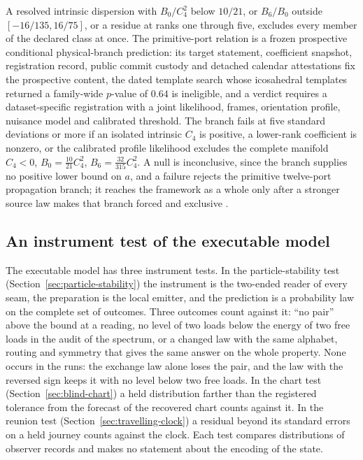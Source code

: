 \documentclass[11pt]{article}
\theoremstyle{definition}
\theoremstyle{remark}
\begin{document}
A resolved intrinsic dispersion with $B_0/C_4^2$ below $10/21$, or $B_6/B_0$
outside $[-16/135,16/75]$, or a residue at ranks one through five, excludes
every member of the declared class at once. The primitive-port relation is a
frozen prospective conditional physical-branch prediction: its target
statement, coefficient snapshot, registration record, public commit custody
and detached calendar attestations fix the prospective content, the dated
template search whose icosahedral templates returned a family-wide $p$-value
of $0.64$ is ineligible, and a verdict requires a dataset-specific
registration with a joint likelihood, frames, orientation profile, nuisance
model and calibrated threshold. The branch fails at five standard deviations
or more if an isolated intrinsic $C_4$ is positive, a lower-rank coefficient
is nonzero, or the calibrated profile likelihood excludes the complete
manifold $C_4<0$, $B_0=\tfrac{10}{21}C_4^2$, $B_6=\tfrac{32}{315}C_4^2$. A
null is inconclusive, since the branch supplies no positive lower bound on
$a$, and a failure rejects the primitive twelve-port propagation branch; it
reaches the framework as a whole only after a stronger source law makes that
branch forced and exclusive \cite{ophregister}.

\subsection{An instrument test of the executable model}
\label{sec:instrument-test}

The executable model has three instrument tests. In the particle-stability
test (Section~\ref{sec:particle-stability}) the instrument is the two-ended
reader of every seam, the preparation is the local emitter, and the
prediction is a probability law on the complete set of outcomes. Three
outcomes count against it: ``no pair'' above the bound at a reading, no
level of two loads below the energy of two free loads in the audit of the
spectrum, or a changed law with the same alphabet, routing and symmetry
that gives the same answer on the whole property. None occurs in the
runs: the exchange law alone loses the pair, and the law with the reversed
sign keeps it with no level below two free loads. In the chart test
(Section~\ref{sec:blind-chart}) a held distribution farther than the
registered tolerance from the forecast of the recovered chart counts
against it. In the reunion test (Section~\ref{sec:travelling-clock}) a
residual beyond its standard errors on a held journey counts against the
clock. Each test compares distributions of observer records and makes no
statement about the encoding of the state.
\end{document}
